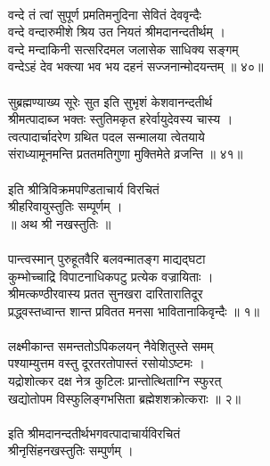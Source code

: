 \\
वन्दे तं त्वां सुपूर्ण प्रमतिमनुदिना सेवितं देववृन्दैः\\
     वन्दे वन्दारुमीशे श्रिय उत नियतं श्रीमदानन्दतीर्थम् ।\\
वन्दे मन्दाकिनी सत्सरिदमल जलासेक साधिक्य सङ्गम्\\
     वन्देऽहं देव भक्त्या भव भय दहनं सज्जनान्मोदयन्तम् ॥ ४०॥\\
\\
सुब्रह्मण्याख्य सूरेः सुत इति सुभृशं केशवानन्दतीर्थ\\
     श्रीमत्पादाब्ज भक्तः स्तुतिमकृत हरेर्वायुदेवस्य चास्य ।\\
त्वत्पादार्चादरेण ग्रथित पदल सन्मालया त्वेतयाये\\
     संराध्यामूनमन्ति प्रततमतिगुणा मुक्तिमेते व्रजन्ति ॥ ४१॥\\
\\
          इति श्रीत्रिविक्रमपण्डिताचार्य विरचितं\\
          श्रीहरिवायुस्तुतिः सम्पूर्णम् ।\\
 ॥ अथ श्री नखस्तुतिः ॥\\
\\
पान्त्वस्मान् पुरुहूतवैरि बलवन्मातङ्ग माद्यद्घटा\\
     कुम्भोच्चाद्रि विपाटनाधिकपटु प्रत्येक वज्रायिताः ।\\
श्रीमत्कण्ठीरवास्य प्रतत सुनखरा दारितारातिदूर\\
     प्रद्ध्वस्तध्वान्त शान्त प्रवितत मनसा भावितानाकिवृन्दैः ॥ १॥\\
\\
लक्ष्मीकान्त समन्ततोऽपिकलयन् नैवेशितुस्ते समम्\\
     पश्याम्युत्तम वस्तु दूरतरतोपास्तं रसोयोऽष्टमः ।\\
यद्रोशोत्कर दक्ष नेत्र कुटिलः प्रान्तोत्थिताग्नि स्फुरत्\\
     खद्योतोपम विस्फुलिङ्गभसिता ब्रह्मेशशक्रोत्कराः ॥ २॥\\
\\
इति श्रीमदानन्दतीर्थभगवत्पादाचार्यविरचितं \\
श्रीनृसिंहनखस्तुतिः सम्पुर्णम् । \\
